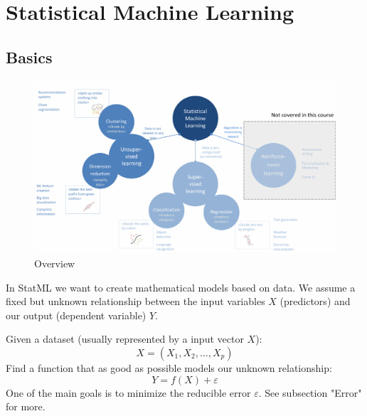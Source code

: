 \documentclass[../Main.tex]{subfiles}
\begin{document}
\chapter{Statistical Machine Learning}

\intro{

}

\section{Basics}
\begin{figure}[H]
    \centering
    \includegraphics[width=1\linewidth]{Images/overview.png}
    \caption{Overview}
\end{figure}



In StatML we want to create mathematical models based on data.
We assume a fixed but unknown relationship between the input variables \(X\) (predictors) and our
output (dependent variable) \(Y\).

Given a dataset (usually represented by a input vector \(X\)):
\begin{equation*}
    X = (X_1, X_2, \dots, X_p)
\end{equation*}
Find a function that as good as possible models our unknown relationship:
\begin{equation*}
    Y = f(X) + \varepsilon
\end{equation*}
One of the main goals is to minimize the reducible error \(\varepsilon\). See subsection "Error" for more.
\end{document}
